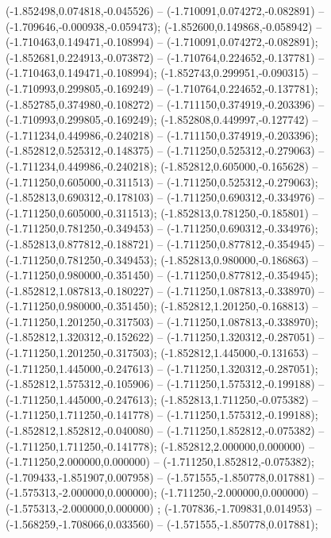  (-1.852498,0.074818,-0.045526) -- (-1.710091,0.074272,-0.082891) -- (-1.709646,-0.000938,-0.059473);
 (-1.852600,0.149868,-0.058942) -- (-1.710463,0.149471,-0.108994) -- (-1.710091,0.074272,-0.082891);
 (-1.852681,0.224913,-0.073872) -- (-1.710764,0.224652,-0.137781) -- (-1.710463,0.149471,-0.108994);
 (-1.852743,0.299951,-0.090315) -- (-1.710993,0.299805,-0.169249) -- (-1.710764,0.224652,-0.137781);
 (-1.852785,0.374980,-0.108272) -- (-1.711150,0.374919,-0.203396) -- (-1.710993,0.299805,-0.169249);
 (-1.852808,0.449997,-0.127742) -- (-1.711234,0.449986,-0.240218) -- (-1.711150,0.374919,-0.203396);
 (-1.852812,0.525312,-0.148375) -- (-1.711250,0.525312,-0.279063) -- (-1.711234,0.449986,-0.240218);
 (-1.852812,0.605000,-0.165628) -- (-1.711250,0.605000,-0.311513) -- (-1.711250,0.525312,-0.279063);
 (-1.852813,0.690312,-0.178103) -- (-1.711250,0.690312,-0.334976) -- (-1.711250,0.605000,-0.311513);
 (-1.852813,0.781250,-0.185801) -- (-1.711250,0.781250,-0.349453) -- (-1.711250,0.690312,-0.334976);
 (-1.852813,0.877812,-0.188721) -- (-1.711250,0.877812,-0.354945) -- (-1.711250,0.781250,-0.349453);
 (-1.852813,0.980000,-0.186863) -- (-1.711250,0.980000,-0.351450) -- (-1.711250,0.877812,-0.354945);
 (-1.852812,1.087813,-0.180227) -- (-1.711250,1.087813,-0.338970) -- (-1.711250,0.980000,-0.351450);
 (-1.852812,1.201250,-0.168813) -- (-1.711250,1.201250,-0.317503) -- (-1.711250,1.087813,-0.338970);
 (-1.852812,1.320312,-0.152622) -- (-1.711250,1.320312,-0.287051) -- (-1.711250,1.201250,-0.317503);
 (-1.852812,1.445000,-0.131653) -- (-1.711250,1.445000,-0.247613) -- (-1.711250,1.320312,-0.287051);
 (-1.852812,1.575312,-0.105906) -- (-1.711250,1.575312,-0.199188) -- (-1.711250,1.445000,-0.247613);
 (-1.852813,1.711250,-0.075382) -- (-1.711250,1.711250,-0.141778) -- (-1.711250,1.575312,-0.199188);
 (-1.852812,1.852812,-0.040080) -- (-1.711250,1.852812,-0.075382) -- (-1.711250,1.711250,-0.141778);
 (-1.852812,2.000000,0.000000) -- (-1.711250,2.000000,0.000000) -- (-1.711250,1.852812,-0.075382);
 (-1.709433,-1.851907,0.007958) -- (-1.571555,-1.850778,0.017881) -- (-1.575313,-2.000000,0.000000);
 (-1.711250,-2.000000,0.000000) -- (-1.575313,-2.000000,0.000000) ;
 (-1.707836,-1.709831,0.014953) -- (-1.568259,-1.708066,0.033560) -- (-1.571555,-1.850778,0.017881);
